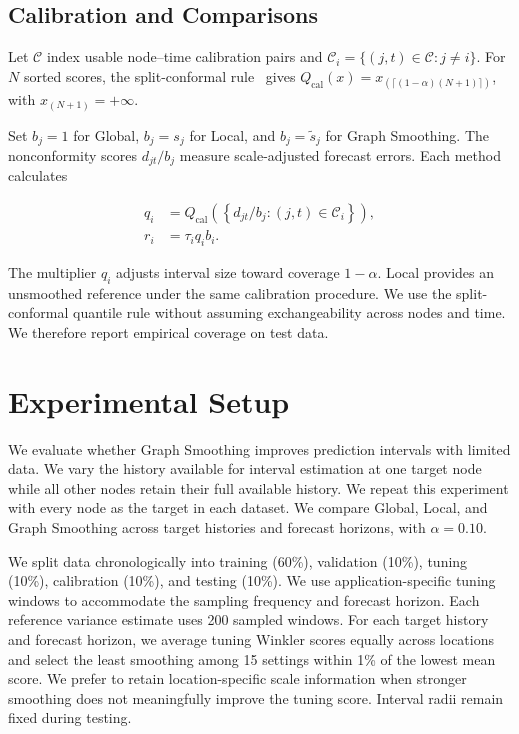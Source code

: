 \documentclass[conference]{IEEEtran}
\begin{document}
\subsection{Calibration and Comparisons}

Let $\mathcal C$ index usable node--time calibration pairs and $\mathcal C_i=\{(j,t)\in\mathcal C:j\ne i\}$. For $N$ sorted scores, the split-conformal rule~\cite{lei2018distributionfree} gives $Q_{\mathrm{cal}}(x)=x_{(\lceil(1-\alpha)(N+1)\rceil)}$, with $x_{(N+1)}=+\infty$.

Set $b_j=1$ for Global, $b_j=s_j$ for Local, and $b_j=\tilde s_j$ for Graph Smoothing. The nonconformity scores $d_{jt}/b_j$ measure scale-adjusted forecast errors. Each method calculates

\begin{equation}
\begin{aligned}
q_i&=Q_{\mathrm{cal}}\!\left(
\left\{d_{jt}/b_j:(j,t)\in\mathcal C_i\right\}\right),\\
r_i&=\tau_i q_i b_i.
\end{aligned}
\label{eq:calibrated-radius}
\end{equation}

The multiplier $q_i$ adjusts interval size toward coverage $1-\alpha$. Local provides an unsmoothed reference under the same calibration procedure. We use the split-conformal quantile rule without assuming exchangeability across nodes and time. We therefore report empirical coverage on test data.

\section{Experimental Setup}
\label{sec:setup}

We evaluate whether Graph Smoothing improves prediction intervals with limited data. We vary the history available for interval estimation at one target node while all other nodes retain their full available history. We repeat this experiment with every node as the target in each dataset. We compare Global, Local, and Graph Smoothing across target histories and forecast horizons, with $\alpha=0.10$.

We split data chronologically into training (60\%), validation (10\%), tuning (10\%), calibration (10\%), and testing (10\%). We use application-specific tuning windows to accommodate the sampling frequency and forecast horizon. Each reference variance estimate uses 200 sampled windows. For each target history and forecast horizon, we average tuning Winkler scores equally across locations and select the least smoothing among 15 settings within 1\% of the lowest mean score. We prefer to retain location-specific scale information when stronger smoothing does not meaningfully improve the tuning score. Interval radii remain fixed during testing.
\end{document}
